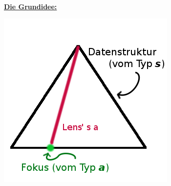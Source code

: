 \documentclass{beamer}
\begin{document}

\begin{frame}

\Large \textbf{\underline{Die Grundidee:}}\normalsize

\begin{center}
\includegraphics[scale=0.5]{lens_3.png} 
\end{center}

\end{frame}

\end{document}
